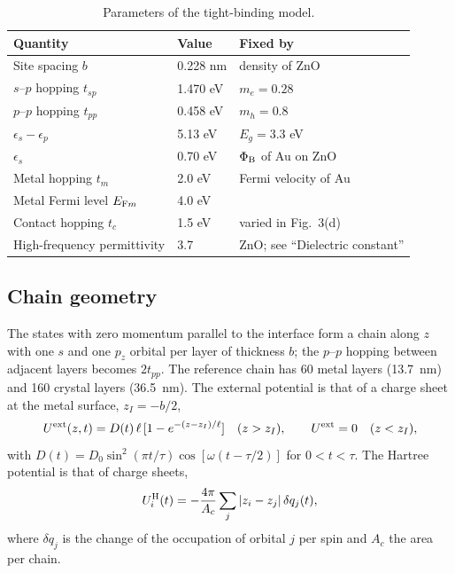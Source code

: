 \documentclass[aps,prl,onecolumn,superscriptaddress,notitlepage]{revtex4-2}
\begin{document}
\begin{table}[h]
\caption{Parameters of the tight-binding model.}
\label{tab:par}
\begin{tabular}{lll}
\hline\hline
Quantity & Value & Fixed by \\
\hline
Site spacing $b$ & 0.228 nm & density of ZnO \\
$s$--$p$ hopping $t_{sp}$ & 1.470 eV & $m_e=0.28$ \\
$p$--$p$ hopping $t_{pp}$ & 0.458 eV & $m_h=0.8$ \\
$\epsilon_s-\epsilon_p$ & 5.13 eV & $E_g=3.3$ eV \\
$\epsilon_s$ & 0.70 eV & $\Phi_{\rm B}$ of Au on ZnO \\
Metal hopping $t_m$ & 2.0 eV & Fermi velocity of Au \\
Metal Fermi level $E_{{\rm F}m}$ & 4.0 eV & \\
Contact hopping $t_c$ & 1.5 eV & varied in Fig.~3(d) \\
High-frequency permittivity & 3.7 & ZnO; see ``Dielectric constant'' \\
\hline\hline
\end{tabular}
\end{table}

\subsection{Chain geometry}
The states with zero momentum parallel to the interface form a chain along $z$ with one $s$ and
one $p_z$ orbital per layer of thickness $b$; the $p$--$p$ hopping between adjacent layers becomes
$2t_{pp}$. The reference chain has 60 metal layers (13.7~nm) and 160 crystal layers (36.5~nm). The
external potential is that of a charge sheet at the metal surface, $z_I=-b/2$,
\begin{equation}
U^{\rm ext}(z,t)=D(t)\,\ell\,[1-e^{-(z-z_I)/\ell}]\quad(z>z_I),\qquad U^{\rm ext}=0\quad(z<z_I),
\end{equation}
with $D(t)=D_0\sin^2(\pi t/\tau)\cos[\omega(t-\tau/2)]$ for $0<t<\tau$. The Hartree potential is that
of charge sheets,
\begin{equation}
U^{\rm H}_i(t)=-\frac{4\pi}{A_c}\sum_j|z_i-z_j|\,\delta q_j(t),
\label{eq:h1}
\end{equation}
where $\delta q_j$ is the change of the occupation of orbital $j$ per spin and $A_c$ the area per
chain.
\end{document}
